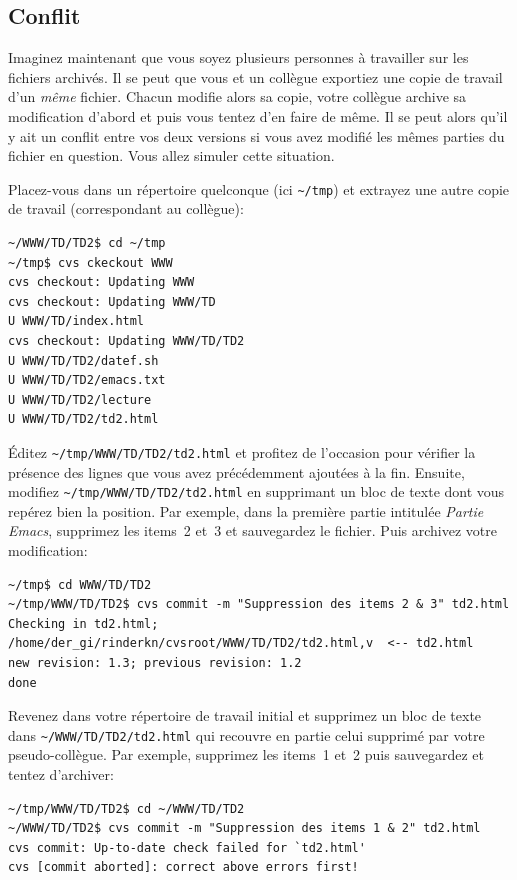 \documentclass[11pt,a4paper]{article}
\begin{document}
\subsection{Conflit}

Imaginez maintenant que vous soyez plusieurs personnes à travailler
sur les fichiers archivés. Il se peut que vous et un collègue
exportiez une copie de travail d'un \emph{même} fichier. Chacun
modifie alors sa copie, votre collègue archive sa modification d'abord
et puis vous tentez d'en faire de même. Il se peut alors qu'il y ait
un conflit entre vos deux versions si vous avez modifié les mêmes
parties du fichier en question. Vous allez simuler cette situation.

Placez-vous dans un répertoire quelconque (ici \verb|~/tmp|) et
extrayez une autre copie de travail (correspondant au collègue):

{\small
\begin{verbatim}
~/WWW/TD/TD2$ cd ~/tmp
~/tmp$ cvs ckeckout WWW
cvs checkout: Updating WWW
cvs checkout: Updating WWW/TD
U WWW/TD/index.html
cvs checkout: Updating WWW/TD/TD2
U WWW/TD/TD2/datef.sh
U WWW/TD/TD2/emacs.txt
U WWW/TD/TD2/lecture
U WWW/TD/TD2/td2.html
\end{verbatim}
}

Éditez \verb|~/tmp/WWW/TD/TD2/td2.html| et profitez de l'occasion pour
vérifier la présence des lignes que vous avez précédemment ajoutées à
la fin. Ensuite, modifiez \verb|~/tmp/WWW/TD/TD2/td2.html| en
supprimant un bloc de texte dont vous repérez bien la position. Par
exemple, dans la première partie intitulée \textsl{Partie Emacs},
supprimez les items~2 et~3 et sauvegardez le fichier. Puis archivez
votre modification:

{\small
\begin{verbatim}
~/tmp$ cd WWW/TD/TD2
~/tmp/WWW/TD/TD2$ cvs commit -m "Suppression des items 2 & 3" td2.html
Checking in td2.html;
/home/der_gi/rinderkn/cvsroot/WWW/TD/TD2/td2.html,v  <-- td2.html
new revision: 1.3; previous revision: 1.2
done
\end{verbatim}
}

Revenez dans votre répertoire de travail initial et supprimez un bloc
de texte dans \verb|~/WWW/TD/TD2/td2.html| qui recouvre en partie
celui supprimé par votre pseudo-collègue. Par exemple, supprimez les
items~1 et~2 puis sauvegardez et tentez d'archiver:

{\small
\begin{verbatim}
~/tmp/WWW/TD/TD2$ cd ~/WWW/TD/TD2
~/WWW/TD/TD2$ cvs commit -m "Suppression des items 1 & 2" td2.html
cvs commit: Up-to-date check failed for `td2.html'
cvs [commit aborted]: correct above errors first!
\end{verbatim}
}
\end{document}
